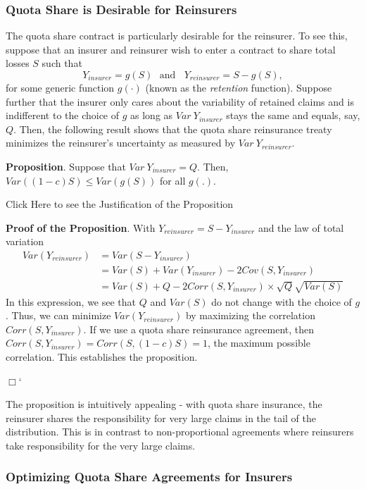 \documentclass[]{book}
\theoremstyle{definition}
\theoremstyle{definition}
\theoremstyle{definition}
\theoremstyle{remark}
\begin{document}
\subsubsection{Quota Share is Desirable for
Reinsurers}\label{quota-share-is-desirable-for-reinsurers}

The quota share contract is particularly desirable for the reinsurer. To
see this, suppose that an insurer and reinsurer wish to enter a contract
to share total losses \(S\) such that
\[Y_{insurer}=g(S) \ \ \ \text{and} \ \ \ \ Y_{reinsurer}=S-g(S),\] for
some generic function \(g(\cdot)\) (known as the \emph{retention}
function). Suppose further that the insurer only cares about the
variability of retained claims and is indifferent to the choice of \(g\)
as long as \(Var~Y_{insurer}\) stays the same and equals, say, \(Q\).
Then, the following result shows that the quota share reinsurance treaty
minimizes the reinsurer's uncertainty as measured by
\(Var~Y_{reinsurer}\).

\textbf{Proposition}. Suppose that \(Var~Y_{insurer}=Q.\) Then,
\(Var ((1-c)S) \le Var(g(S))\) for all \(g(.)\).

Click Here to see the Justification of the Proposition

\hypertarget{toggleProof}{}
\textbf{Proof of the Proposition}. With
\(Y_{reinsurer} = S - Y_{insurer}\) and the law of total variation \[
\begin{array}{ll}
Var (Y_{reinsurer}) &= Var (S-Y_{insurer}) \\
&= Var (S) + Var (Y_{insurer})  - 2 Cov (S,Y_{insurer}) \\
&=Var (S) + Q - 2 Corr (S,Y_{insurer}) \times \sqrt{Q} \sqrt{Var (S)}
\end{array}
\] In this expression, we see that \(Q\) and \(Var(S)\) do not change
with the choice of \(g\). Thus, we can minimize \(Var (Y_{reinsurer})\)
by maximizing the correlation \(Corr (S,Y_{insurer})\). If we use a
quota share reinsurance agreement, then
\(Corr (S,Y_{insurer})=Corr (S,(1-c)S)=1\), the maximum possible
correlation. This establishes the proposition.

\(\Box\)`

The proposition is intuitively appealing - with quota share insurance,
the reinsurer shares the responsibility for very large claims in the
tail of the distribution. This is in contrast to non-proportional
agreements where reinsurers take responsibility for the very large
claims.

\subsubsection{Optimizing Quota Share Agreements for
Insurers}\label{optimizing-quota-share-agreements-for-insurers}
\end{document}
